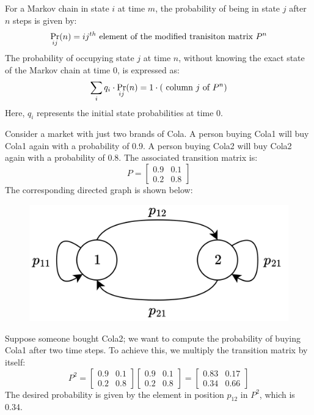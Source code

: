 For a Markov chain in state $i$ at time $m$, the probability of being in state $j$ after $n$ steps is given by:
\[\Pr_{ij}(n)=ij^{th} \textnormal{ element of the modified tranisiton matrix }P^n\]
The probability of occupying state $j$ at time $n$, without knowing the exact state of the Markov chain at time 0, is expressed as:
\[\sum_i q_i\cdot\Pr_{ij}(n)=1 \cdot (\textnormal{ column } j \textnormal{ of }P^n) \]
Here, $q_i$ represents the initial state probabilities at time 0.
\begin{example}
    Consider a market with just two brands of Cola. 
    A person buying Cola1 will buy Cola1 again with a probability of 0.9. 
    A person buying Cola2 will buy Cola2 again with a probability of 0.8. 
    The associated transition matrix is:
    \[P=
    \begin{bmatrix}
        0.9 & 0.1 \\
        0.2 & 0.8
    \end{bmatrix}\]
    The corresponding directed graph is shown below:
    \begin{figure}[H]
        \centering
        \includegraphics[width=0.5\linewidth]{images/cola.png}
    \end{figure}
    Suppose someone bought Cola2; we want to compute the probability of buying Cola1 after two time steps. 
    To achieve this, we multiply the transition matrix by itself:
    \[P^2=
    \begin{bmatrix}
        0.9 & 0.1 \\
        0.2 & 0.8
    \end{bmatrix}
    \begin{bmatrix}
        0.9 & 0.1 \\
        0.2 & 0.8
    \end{bmatrix}
    =
    \begin{bmatrix}
        0.83 & 0.17 \\
        0.34 & 0.66
    \end{bmatrix}\]
    The desired probability is given by the element in position $p_{12}$ in $P^2$, which is 0.34.
    

\end{example}
